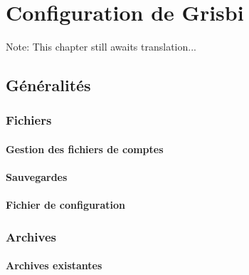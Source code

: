 
\chapter{Configuration de Grisbi\label{setup}}

Note: This chapter still awaits translation...


\section{Généralités\label{setup-general}}


\subsection{Fichiers\label{setup-general-files}}

\subsubsection{Gestion des fichiers de comptes\label{setup-general-files-manage}}


\subsubsection{Sauvegardes\label{setup-general-files-backup}}


\subsubsection{Fichier de configuration\label{setup-general-files-config}}

\subsection{Archives\label{setup-general-archives}}

\subsubsection{Archives existantes\label{setup-general-archives-existing}}

